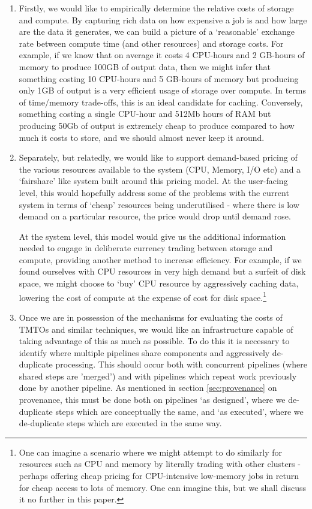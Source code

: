 \documentclass[10pt,a4paper]{article}
\begin{document}
\begin{enumerate}
\item Firstly, we would like to empirically determine the relative costs of storage and compute. By capturing rich data on how expensive a job is and how large are the data it generates, we can build a picture of a `reasonable' exchange rate between compute time (and other resources) and storage costs. For example, if we know that on average it costs 4 CPU-hours and 2 GB-hours of memory to produce 100GB of output data, then we might infer that something costing 10 CPU-hours and 5 GB-hours of memory but producing only 1GB of output is a very efficient usage of storage over compute. In terms of time/memory trade-offs, this is an ideal candidate for caching. Conversely, something costing a single CPU-hour and 512Mb hours of RAM but producing 50Gb of output is extremely cheap to produce compared to how much it costs to store, and we should almost never keep it around.
\item Separately, but relatedly, we would like to support demand-based pricing of the various resources available to the system (CPU, Memory, I/O etc) and a `fairshare' like system built around this pricing model. At the user-facing level, this would hopefully address some of the problems with the current system in terms of `cheap' resources being underutilised - where there is low demand on a particular resource, the price would drop until demand rose.

At the system level, this model would give us the additional information needed to engage in deliberate currency trading between storage and compute, providing another method to increase efficiency. For example, if we found ourselves with CPU resources in very high demand but a surfeit of disk space, we might choose to `buy' CPU resource by aggressively caching data, lowering the cost of compute at the expense of cost for disk space.\footnote{One can imagine a scenario where we might attempt to do similarly for resources such as CPU and memory by literally trading with other clusters - perhaps offering cheap pricing for CPU-intensive low-memory jobs in return for cheap access to lots of memory. One can imagine this, but we shall discuss it no further in this paper.}
\item Once we are in possession of the mechanisms for evaluating the costs of TMTOs and similar techniques, we would like an infrastructure capable of taking advantage of this as much as possible. To do this it is necessary to identify where multiple pipelines share components and aggressively de-duplicate processing. This should occur both with concurrent pipelines (where shared steps are 'merged') and with pipelines which repeat work previously done by another pipeline. As mentioned in section \ref{sec:provenance} on provenance, this must be done both on pipelines `as designed', where we de-duplicate steps which are conceptually the same, and `as executed', where we de-duplicate steps which are executed in the same way.


\end{enumerate}
\end{document}
